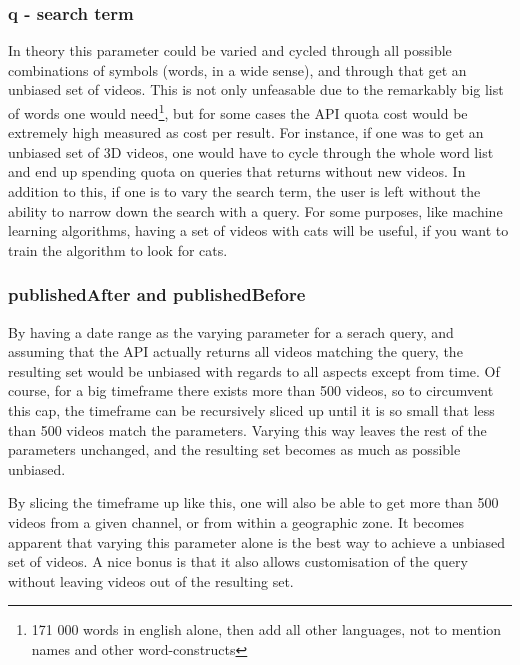 \subsubsection{q - search term}
In theory this parameter could be varied and cycled through all possible
combinations of symbols (words, in a wide sense), and through that get an
unbiased set of videos. This is not only unfeasable due to the remarkably big
list of words one would need\footnote{171 000 words in english alone, then add
all other languages, not to mention names and other word-constructs}, but for
some cases the API quota cost would be extremely high measured as cost per
result. For instance, if one was to get an unbiased set of 3D videos, one would
have to cycle through the whole word list and end up spending quota on queries
that returns without new videos. In addition to this, if one is to vary the
search term, the user is left without the ability to narrow down the search
with a query. For some purposes, like machine learning algorithms, having a set
of videos with cats will be useful, if you want to train the algorithm to look
for cats.

\subsubsection{publishedAfter and publishedBefore}
By having a date range as the varying parameter for a serach query, and assuming
that the API actually returns all videos matching the query, the resulting set
would be unbiased with regards to all aspects except from time. Of course, for
a big timeframe there exists more than 500 videos, so to circumvent this cap,
the timeframe can be recursively sliced up until it is so small that less than
500 videos match the parameters. Varying this way leaves the rest of the
parameters unchanged, and the resulting set becomes as much as possible
unbiased.

By slicing the timeframe up like this, one will also be able to get more than
500 videos from a given channel, or from within a geographic zone. It becomes
apparent that varying this parameter alone is the best way to achieve a unbiased
set of videos. A nice bonus is that it also allows customisation of the query
without leaving videos out of the resulting set.

